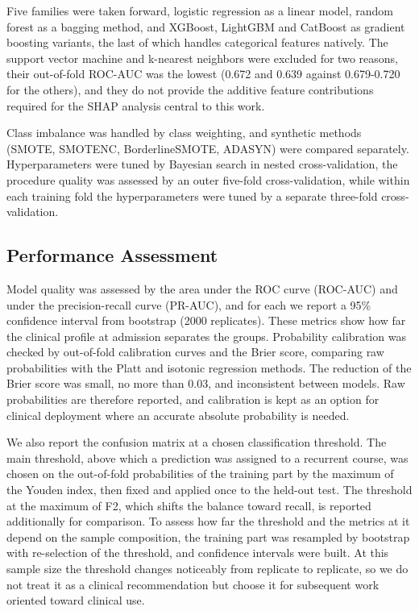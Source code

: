 \documentclass[pdflatex,sn-basic,Numbered]{sn-jnl}
\begin{document}
Five families were taken forward, logistic regression as a linear model, random forest as a bagging method, and XGBoost, LightGBM and CatBoost as gradient boosting variants, the last of which handles categorical features natively. The support vector machine and k-nearest neighbors were excluded for two reasons, their out-of-fold ROC-AUC was the lowest (0.672 and 0.639 against 0.679-0.720 for the others), and they do not provide the additive feature contributions required for the SHAP analysis central to this work.

Class imbalance was handled by class weighting, and synthetic methods (SMOTE, SMOTENC, BorderlineSMOTE, ADASYN) were compared separately. Hyperparameters were tuned by Bayesian search in nested cross-validation, the procedure quality was assessed by an outer five-fold cross-validation, while within each training fold the hyperparameters were tuned by a separate three-fold cross-validation.

\subsection{Performance Assessment}\label{subsec2_9}

Model quality was assessed by the area under the ROC curve (ROC-AUC) and under the precision-recall curve (PR-AUC), and for each we report a 95\% confidence interval from bootstrap (2000 replicates). These metrics show how far the clinical profile at admission separates the groups. Probability calibration was checked by out-of-fold calibration curves and the Brier score, comparing raw probabilities with the Platt and isotonic regression methods. The reduction of the Brier score was small, no more than 0.03, and inconsistent between models. Raw probabilities are therefore reported, and calibration is kept as an option for clinical deployment where an accurate absolute probability is needed.

We also report the confusion matrix at a chosen classification threshold. The main threshold, above which a prediction was assigned to a recurrent course, was chosen on the out-of-fold probabilities of the training part by the maximum of the Youden index, then fixed and applied once to the held-out test. The threshold at the maximum of F2, which shifts the balance toward recall, is reported additionally for comparison. To assess how far the threshold and the metrics at it depend on the sample composition, the training part was resampled by bootstrap with re-selection of the threshold, and confidence intervals were built. At this sample size the threshold changes noticeably from replicate to replicate, so we do not treat it as a clinical recommendation but choose it for subsequent work oriented toward clinical use.
\end{document}
